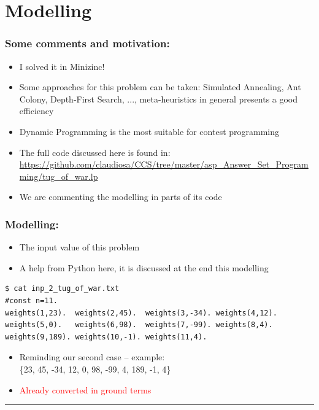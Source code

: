 \documentclass{beamer}
\begin{document}
\section{Modelling}
\begin{frame}[fragile] 
	\frametitle{Some comments and motivation:}
	
\begin{block}{}
  \begin{itemize}

 \item I solved it in Minizinc!

  \item Some approaches for this problem can be taken: Simulated Annealing, Ant Colony, Depth-First Search, ..., meta-heuristics in general presents a good efficiency

\item Dynamic Programming is the most suitable for contest programming

  \item The full code discussed here is found in:\\ \url{https://github.com/claudiosa/CCS/tree/master/asp_Answer_Set_Programming/tug_of_war.lp}

  \item We are commenting the modelling in parts of its code

   \end{itemize}
 \end{block}
	
	
\end{frame}
\begin{frame}[fragile] 
\frametitle{Modelling: }

\begin{itemize}
  \item The input value of this problem
  \pause
  \item A help from Python here, it is discussed at the end this modelling

 \end{itemize}

	
{\small
\begin{verbatim}
$ cat inp_2_tug_of_war.txt
#const n=11.
weights(1,23).  weights(2,45).  weights(3,-34). weights(4,12). 
weights(5,0).   weights(6,98).  weights(7,-99). weights(8,4). 
weights(9,189). weights(10,-1). weights(11,4).
\end{verbatim}
}	

\begin{itemize}
\item Reminding our second case -- example:\\
 \{23, 45, -34, 12, 0, 98, -99, 4, 189, -1, 4\}

\item  \textcolor{red}{Already converted in ground terms}

\end{itemize}

\textcolor{red}{\rule{\textwidth}{1.7pt} } 

\end{frame}
\end{document}
